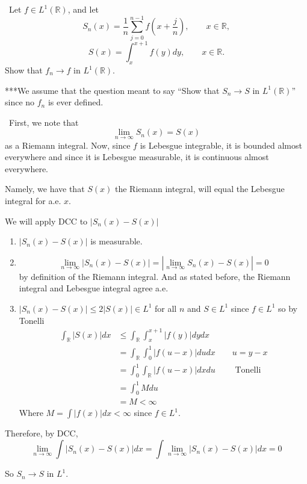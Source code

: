 \documentclass[12pt]{Qual}
\begin{document}
\begin{problem} $\,$
Let $f\in L^1(\mathbb{R})$, and let $$S_n(x)=\frac{1}{n}\sum_{j=0}^{n-1}f\left(x+\frac{j}{n}\right),\qquad x\in\mathbb{R},$$ $$S(x)=\int_x^{x+1}f(y)dy,\qquad x\in\mathbb{R}.$$ Show that $f_n\to f$ in $L^1(\mathbb{R}).$

\begin{mybox}
***We assume that the question meant to say ``Show that $S_n\to S$ in $L^1(\mathbb{R})$'' since no $f_n$ is ever defined.
\end{mybox}
\end{problem}


\begin{solution}$\,$
First, we note that $$\lim_{n\to\infty}S_n(x)=S(x)$$ as a Riemann integral. Now, since $f$ is Lebesgue integrable, it is bounded almost everywhere and since it is Lebesgue measurable, it is continuous almost everywhere.

Namely, we have that $S(x)$ the Riemann integral, will equal the Lebesgue integral for a.e. $x.$

We will apply DCC to $|S_n(x)-S(x)|$
\begin{enumerate}
    \item $|S_n(x)-S(x)|$ is measurable.
    \item $$\lim_{n\to\infty}|S_n(x)-S(x)|=|\lim_{n\to\infty}S_n(x)-S(x)|=0$$ by definition of the Riemann integral. And as stated before, the Riemann integral and Lebesgue integral agree a.e.
    \item $|S_n(x)-S(x)|\le 2|S(x)|\in L^1$ for all $n$ and $S\in L^1$ since $f\in L^1$ so by Tonelli \begin{align*}
        \int_\mathbb{R}|S(x)|dx&\le \int_\mathbb{R}\int_x^{x+1}|f(y)|dydx\\
        &=\int_\mathbb{R}\int_0^1|f(u-x)|dudx\qquad u=y-x\\
        &=\int_0^1\int_\mathbb{R}|f(u-x)|dxdu\qquad\text{ Tonelli}\\
        &=\int_0^1Mdu\\
        &=M<\infty
    \end{align*}
    Where $M=\int|f(x)|dx<\infty$ since $f\in L^1.$
\end{enumerate}

Therefore, by DCC, $$\lim_{n\to\infty}\int|S_n(x)-S(x)|dx=\int\lim_{n\to\infty}|S_n(x)-S(x)|dx=0$$

So $S_n\to S$ in $L^1.$
\end{solution}
\newpage
\end{document}
